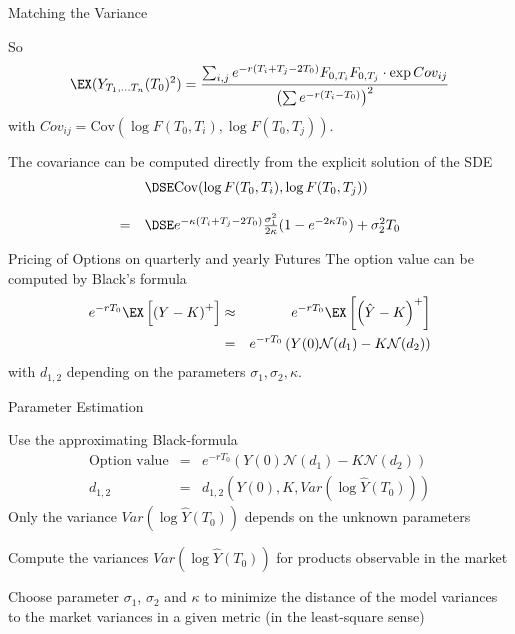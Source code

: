 {Matching the Variance}

So
$$
\EX (Y_{T_1, \ldots T_n}(T_0)^2)
=  \frac{\sum_{i, j}e^{-r(T_i+T_j-2T_0)} F_{0,T_i}F_{0,T_j}\cdot \exp Cov_{ij}}{\left(\sum e^{-r(T_i-T_0)}\right)^2}
$$ with
$Cov_{ij} = \textrm{Cov}(\log F(T_0,T_i), \log F(T_0,T_j))$.

The covariance can be computed directly from the explicit solution of the SDE
$$\begin{array}{ll}
& \DSE \textrm{Cov}(\log F(T_0,T_i), \log F(T_0,T_j)) \\*[12pt]
 = & \DSE
 e^{-\kappa(T_i+T_j-2T_0)}\frac{\sigma_1^2}{2\kappa}(1-e^{-2\kappa T_0})+\sigma_2^2 T_0
\end{array}
$$

{Pricing of Options on quarterly and yearly Futures}
The option value can be computed by Black's formula
\begin{eqnarray*}
e^{-rT_0}\EX\left[\left(Y-K\right)^+\right]&\approx & e^{-rT_0}\EX\left[\left(\hat{Y}-K\right)^+\right]\\
& = &e^{-rT_0}\left(Y(0)\mathcal{N}(d_1) - K\mathcal{N}(d_2)\right)
\end{eqnarray*}
with $d_{1,2}$ depending on the parameters $\sigma_1, \sigma_2, \kappa$.

{Parameter Estimation}






	Use the approximating Black-formula
    \begin{eqnarray*}
        \textrm{Option value}&=&    e^{-rT_0}\left(Y(0)\mathcal{N} (d_1)-K\mathcal{N} (d_2) \right)
\\
        d_{1,2} & = & d_{1,2}\left(Y(0),K,Var(\log \hat{Y}(T_0))\right)
    \end{eqnarray*}
        Only the variance $Var(\log \hat{Y}(T_0))$ depends on the unknown parameters

	Compute the variances $Var(\log\hat{Y}(T_0))$ for products observable in the market

	Choose parameter $\sigma_1$, $\sigma_2$ and $\kappa$ to minimize the distance of the model variances
to the market variances in a given metric (in the least-square sense)






